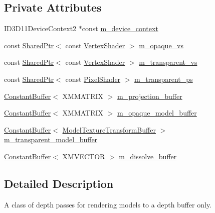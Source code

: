 \subsection*{Private Attributes}
\begin{DoxyCompactItemize}
\item 
I\+D3\+D11\+Device\+Context2 $\ast$const \hyperlink{classmage_1_1_depth_pass_ab7e627aaf0356349e750e89c6b97c7a0}{m\+\_\+device\+\_\+context}
\item 
const \hyperlink{namespacemage_a1e01ae66713838a7a67d30e44c67703e}{Shared\+Ptr}$<$ const \hyperlink{classmage_1_1_vertex_shader}{Vertex\+Shader} $>$ \hyperlink{classmage_1_1_depth_pass_aa410d0303d18d621a7894695b87ccfc2}{m\+\_\+opaque\+\_\+vs}
\item 
const \hyperlink{namespacemage_a1e01ae66713838a7a67d30e44c67703e}{Shared\+Ptr}$<$ const \hyperlink{classmage_1_1_vertex_shader}{Vertex\+Shader} $>$ \hyperlink{classmage_1_1_depth_pass_a0227142e9867e0599c770bdbe0c2241c}{m\+\_\+transparent\+\_\+vs}
\item 
const \hyperlink{namespacemage_a1e01ae66713838a7a67d30e44c67703e}{Shared\+Ptr}$<$ const \hyperlink{namespacemage_a27ecaf266420ee7a494d64edc0757129}{Pixel\+Shader} $>$ \hyperlink{classmage_1_1_depth_pass_a5b6a53892db2e9d9fd1a21c3b8cf6d19}{m\+\_\+transparent\+\_\+ps}
\item 
\hyperlink{structmage_1_1_constant_buffer}{Constant\+Buffer}$<$ X\+M\+M\+A\+T\+R\+IX $>$ \hyperlink{classmage_1_1_depth_pass_a4c9833ceaf223b73404edab4cf81b7c1}{m\+\_\+projection\+\_\+buffer}
\item 
\hyperlink{structmage_1_1_constant_buffer}{Constant\+Buffer}$<$ X\+M\+M\+A\+T\+R\+IX $>$ \hyperlink{classmage_1_1_depth_pass_a4e466580656eb0602d2e00c29b2435a0}{m\+\_\+opaque\+\_\+model\+\_\+buffer}
\item 
\hyperlink{structmage_1_1_constant_buffer}{Constant\+Buffer}$<$ \hyperlink{structmage_1_1_model_texture_transform_buffer}{Model\+Texture\+Transform\+Buffer} $>$ \hyperlink{classmage_1_1_depth_pass_a4b6a38c56e02b6185c1eef8bcaaa5786}{m\+\_\+transparent\+\_\+model\+\_\+buffer}
\item 
\hyperlink{structmage_1_1_constant_buffer}{Constant\+Buffer}$<$ X\+M\+V\+E\+C\+T\+OR $>$ \hyperlink{classmage_1_1_depth_pass_ab8ef293d922a965a92825b8226b9d87c}{m\+\_\+dissolve\+\_\+buffer}
\end{DoxyCompactItemize}


\subsection{Detailed Description}
A class of depth passes for rendering models to a depth buffer only. 

